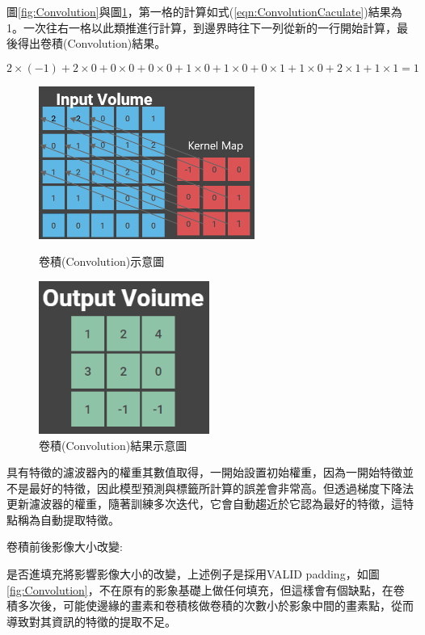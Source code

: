 %


圖\ref{fig:Convolution}與圖\ref{fig:ConvolutionFinally}，第一格的計算如式(\ref{eqn:ConvolutionCaculate})結果為1。一次往右一格以此類推進行計算，到邊界時往下一列從新的一行開始計算，最後得出卷積(Convolution)結果。

\begin{equation}
	\label{eqn:ConvolutionCaculate}
	2\times(-1)+2\times0+0\times0+0\times0+1\times0+1\times0+0\times1+1\times0+2\times1+1\times1=1
\end{equation}


\begin{figure}[H]
	\centerline{\includegraphics[height=5cm]{pic/CNN1.png}}
	\caption{卷積(Convolution)示意圖}
	\label{fig:Convolution}

	\centerline{\includegraphics[height=5cm]{pic/CNN2.PNG}}
	\caption{卷積(Convolution)結果示意圖}
	\label{fig:ConvolutionFinally}
\end{figure}


\newpage
具有特徵的濾波器內的權重其數值取得，一開始設置初始權重，因為一開始特徵並不是最好的特徵，因此模型預測與標籤所計算的誤差會非常高。但透過梯度下降法更新濾波器的權重，隨著訓練多次迭代，它會自動趨近於它認為最好的特徵，這特點稱為自動提取特徵。


卷積前後影像大小改變:

是否進填充將影響影像大小的改變，上述例子是採用VALID padding，如圖\ref{fig:Convolution}，不在原有的影象基礎上做任何填充，但這樣會有個缺點，在卷積多次後，可能使邊緣的畫素和卷積核做卷積的次數小於影象中間的畫素點，從而導致對其資訊的特徵的提取不足。


